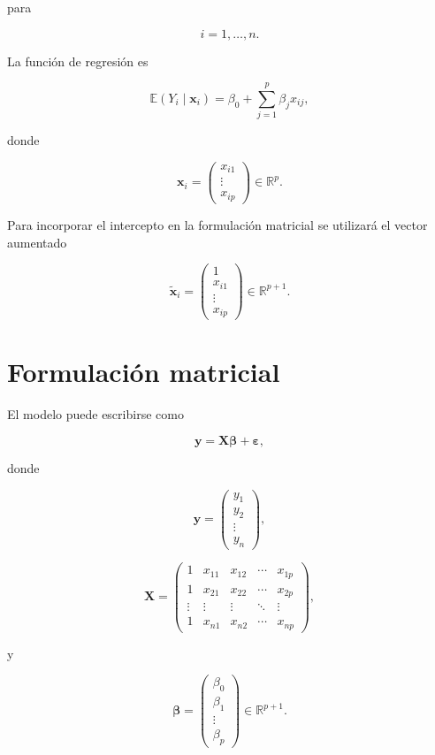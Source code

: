 \documentclass[
  spanish,
  10.5pt,
  letterpaper,
  DIV=11,
  numbers=noendperiod,
  oneside,
  open=any]{scrreprt}
\theoremstyle{definition}
\theoremstyle{definition}
\theoremstyle{plain}
\theoremstyle{remark}
\begin{document}
para

\[
i=1,\ldots,n.
\]

La función de regresión es

\[
\mathbb{E}(Y_i\mid\mathbf{x}_i)
=
\beta_0
+
\sum_{j=1}^{p}
\beta_j x_{ij},
\]

donde

\[
\mathbf{x}_i
=
\begin{pmatrix}
x_{i1}\\
\vdots\\
x_{ip}
\end{pmatrix}
\in\mathbb{R}^{p}.
\]

Para incorporar el intercepto en la formulación matricial se utilizará
el vector aumentado

\[
\widetilde{\mathbf{x}}_i
=
\begin{pmatrix}
1\\
x_{i1}\\
\vdots\\
x_{ip}
\end{pmatrix}
\in\mathbb{R}^{p+1}.
\]

\section*{Formulación matricial}\label{formulaciuxf3n-matricial}


El modelo puede escribirse como

\[
\mathbf{y}
=
\mathbf{X}\boldsymbol{\beta}
+
\boldsymbol{\varepsilon},
\]

donde

\[
\mathbf{y}
=
\begin{pmatrix}
y_1\\
y_2\\
\vdots\\
y_n
\end{pmatrix},
\]

\[
\mathbf{X}
=
\begin{pmatrix}
1 & x_{11} & x_{12} & \cdots & x_{1p}\\
1 & x_{21} & x_{22} & \cdots & x_{2p}\\
\vdots & \vdots & \vdots & \ddots & \vdots\\
1 & x_{n1} & x_{n2} & \cdots & x_{np}
\end{pmatrix},
\]

y

\[
\boldsymbol{\beta}
=
\begin{pmatrix}
\beta_0\\
\beta_1\\
\vdots\\
\beta_p
\end{pmatrix}
\in\mathbb{R}^{p+1}.
\]
\end{document}
